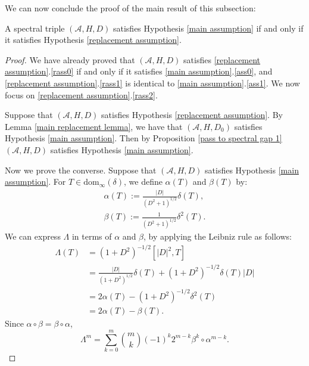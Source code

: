     We can now conclude the proof of the main result of this subsection:
    \begin{thm}\label{replacement thm} 
        A spectral triple $(\mathcal{A},H,D)$ satisfies Hypothesis \ref{main assumption} if and only if it satisfies Hypothesis \ref{replacement assumption}.
    \end{thm}
    \begin{proof}
        We have already proved that $(\mathcal{A},H,D)$ satisfies \ref{replacement assumption}.\eqref{rass0} if and only if it satisfies \ref{main assumption}.\eqref{ass0},
        and \eqref{replacement assumption}.\eqref{rass1} is identical to \eqref{main assumption}.\eqref{ass1}. We now focus on \eqref{replacement assumption}.\eqref{rass2}.
    
        Suppose that $(\mathcal{A},H,D)$ satisfies Hypothesis \ref{replacement assumption}. 
        By Lemma \ref{main replacement lemma}, we have that $(\mathcal{A},H,D_0)$ satisfies Hypothesis \ref{main assumption}. Then by Proposition \ref{pass to spectral gap 1} 
        $(\mathcal{A},H,D)$ satisfies Hypothesis \ref{main assumption}.
        
        Now we prove the converse. Suppose that $(\mathcal{A},H,D)$ satisfies Hypothesis \ref{main assumption}. For $T \in \mathrm{dom}_\infty(\delta)$, we define $\alpha(T)$ and $\beta(T)$ by:
        \begin{align*}
            \alpha(T) := \frac{|D|}{(D^2+1)^{1/2}}\delta(T),\\
            \beta(T) := \frac{1}{(D^2+1)^{1/2}}\delta^2(T).
        \end{align*}
        We can express $\Lambda$ in terms of $\alpha$ and $\beta$, by applying the Leibniz rule as follows:
        \begin{align*}
            \Lambda(T) &= (1+D^2)^{-1/2}[|D|^2,T]\\
                       &= \frac{|D|}{(1+D^2)^{1/2}}\delta(T) + (1+D^2)^{-1/2}\delta(T)|D|\\
                       &= 2\alpha(T) - (1+D^2)^{-1/2}\delta^2(T)\\
                       &= 2\alpha(T)-\beta(T).
        \end{align*}
        Since $\alpha\circ\beta = \beta\circ\alpha$,
        \begin{equation*}
            \Lambda^m = \sum_{k=0}^m \binom{m}{k}(-1)^k2^{m-k}\beta^k\circ\alpha^{m-k}.
        \end{equation*}
        

\end{proof}
